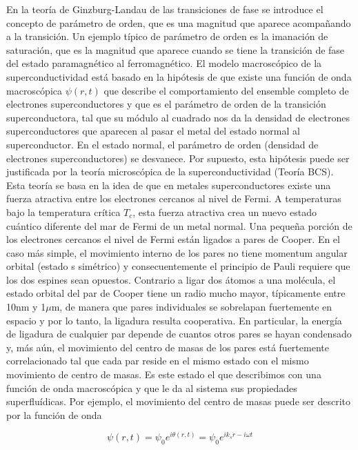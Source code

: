 En la teoría de Ginzburg-Landau \cite{cyrot} de las transiciones de fase se introduce el concepto de parámetro de orden, que es una magnitud que aparece acompañando a la transición. Un ejemplo típico de parámetro de orden es la imanación de saturación, que es la magnitud que aparece cuando se tiene la transición de fase del estado paramagnético al ferromagnético. El modelo macroscópico de la superconductividad está basado en la hipótesis de que existe una función de onda macroscópica $\psi(r,t)$ que describe el comportamiento del ensemble completo de electrones superconductores y que es el parámetro de orden de la transición superconductora, tal que su módulo al cuadrado nos da la densidad de electrones superconductores que aparecen al pasar el metal del estado normal al superconductor. En el estado normal, el parámetro de orden (densidad de electrones superconductores) se desvanece. Por supuesto, esta hipótesis puede ser justificada por la teoría microscópica de la superconductividad (Teoría BCS). Esta teoría se basa en la idea de que en metales superconductores existe una fuerza atractiva entre los electrones cercanos al nivel de Fermi. A temperaturas bajo la temperatura crítica $T_c$, esta fuerza atractiva crea un nuevo estado cuántico diferente del mar de Fermi de un metal normal. Una pequeña porción de los electrones cercanos el nivel de Fermi están ligados a pares de Cooper. En el caso más simple, el movimiento interno de los pares no tiene momentum angular orbital (estado s simétrico) y consecuentemente el principio de Pauli requiere que los dos espines sean opuestos. Contrario a ligar dos átomos a una molécula, el estado orbital del par de Cooper tiene un radio mucho mayor, típicamente entre 10nm y 1$\mu$m, de manera que pares individuales se sobrelapan fuertemente en espacio y por lo tanto, la ligadura resulta cooperativa. En particular, la energía de ligadura de cualquier par depende de cuantos otros pares se hayan condensado y, más aún, el movimiento del centro de masas de los pares está fuertemente correlacionado tal que cada par reside en el mismo estado con el mismo movimiento de centro de masas. Es este estado el que describimos con una función de onda macroscópica y que le da al sistema sus propiedades superfluídicas. Por ejemplo, el movimiento del centro de masas puede ser descrito por la función de onda

\begin{equation}
    \psi(r,t) = \psi_0 e^{i \theta(r,t)} = \psi_0 e^{i k_s \dot r - i \omega t}
\end{equation}

